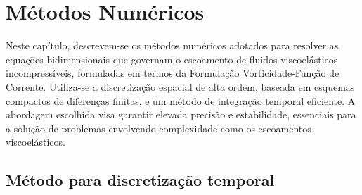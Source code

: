 \chapter[Métodos]{Métodos Numéricos}
\label{Cap_MetodosNumericos}

Neste capítulo, descrevem-se os métodos numéricos adotados para resolver as equações bidimensionais que governam o escoamento de fluidos viscoelásticos incompressíveis, formuladas em termos da Formulação Vorticidade-Função de Corrente. Utiliza-se a discretização espacial de alta ordem, baseada em esquemas compactos de diferenças finitas, e um método de integração temporal eficiente. A abordagem escolhida visa garantir elevada precisão e estabilidade, essenciais para a solução de problemas envolvendo complexidade como os escoamentos viscoelásticos.

\section{Método para discretização temporal}\label{SecDiscretizacaoTemporal}

